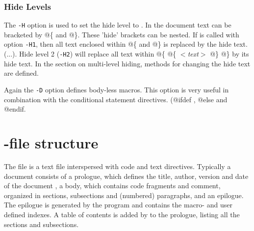 \documentclass{article}
\begin{document}
\subsubsection{Hide Levels}
The {\tt -H\n} option is used to set the hide level to \n. In the \Mx
document text can be bracketed by @\{ and @\}. These 'hide'
brackets can be nested. If \Mx is called with option {\tt -H1}, then
all text enclosed within @\{ and @\} is replaced by the hide text.
(...). Hide level 2 ({\tt -H2}) will replace all text within 
@\{ @\{ {\it $<$text$>$} @\} @\} by its hide text. 
In the section on multi-level hiding, methods for changing the hide
text are defined.

Again the {\tt -D\macro} option defines body-less macros.
This option is very useful in combination with the conditional
statement directives. (@ifdef \macro, @else and @endif.

\section{\Mx-file structure}
The \Mx file is a text file interspersed with code and text directives.
Typically a \Mx document consists of a prologue, which defines the
title, author, version and date of the document , a body, which
contains code fragments and comment, organized in sections,
subsections and (numbered) paragraphs, and an epilogue. The epilogue
is generated by the \Mx program and contains the macro- and user
defined indexes. A table of contents is added by \Mx to the prologue,
listing all the sections and subsections.

\end{document}
